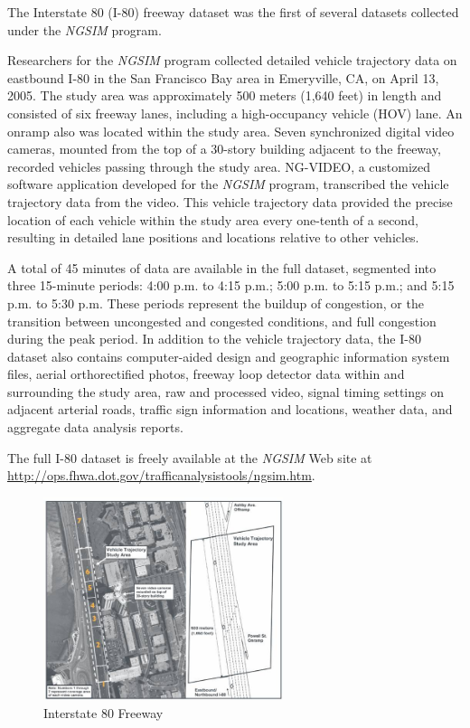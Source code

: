 The Interstate 80 (I-80) freeway dataset was the first of several datasets collected under the {\it NGSIM} program.

Researchers for the {\it NGSIM} program collected detailed vehicle trajectory data on eastbound I-80 in the San Francisco Bay area in Emeryville, CA, on April 13, 2005. The study area was approximately 500 meters (1,640 feet) in length and consisted of six freeway lanes, including a high-occupancy vehicle (HOV) lane. An onramp also was located within the study area. Seven synchronized digital video cameras, mounted from the top of a 30-story building adjacent to the freeway, recorded vehicles passing through the study area. NG-VIDEO, a customized software application developed for the {\it NGSIM} program, transcribed the vehicle trajectory data from the video. This vehicle trajectory data provided the precise location of each vehicle within the study area every one-tenth of a second, resulting in detailed lane positions and locations relative to other vehicles. 

A total of 45 minutes of data are available in the full dataset, segmented into three 15-minute periods: 4:00 p.m. to 4:15 p.m.; 5:00 p.m. to 5:15 p.m.; and 5:15 p.m. to 5:30 p.m. These periods represent the buildup of congestion, or the transition between uncongested and congested conditions, and full congestion during the peak period. In addition to the vehicle trajectory data, the I-80 dataset also contains computer-aided design and geographic information system files, aerial orthorectified photos, freeway loop detector data within and surrounding the study area, raw and processed video, signal timing settings on adjacent arterial roads, traffic sign information and locations, weather data, and aggregate data analysis reports.

The full I-80 dataset is freely available at the {\it NGSIM} Web site at \url{http://ops.fhwa.dot.gov/trafficanalysistools/ngsim.htm}.

\begin{figure}[H]
\begin{center}
\includegraphics[width=7cm]{./figures/image137b.jpg}
\caption{Interstate 80 Freeway}
\label{fig:pict_us80}
\end{center}
\end{figure}



